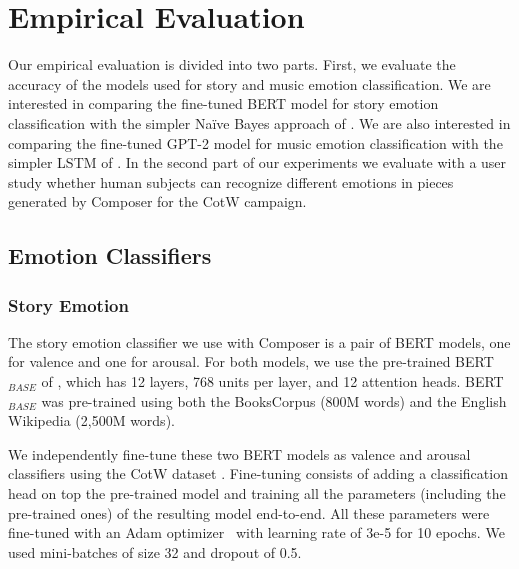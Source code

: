 
\section{Empirical Evaluation}

Our empirical evaluation is divided into two parts. First, we evaluate the accuracy of the models used for story and music emotion classification. We are interested in comparing the fine-tuned BERT model for story emotion classification with the simpler Na\"ive Bayes approach of \cite{padovani2017}. We are also interested in comparing the fine-tuned GPT-2 model for music emotion classification with the simpler LSTM of \cite{ferreira_2019}. In the second part of our experiments we evaluate with a user study whether human subjects can recognize different emotions in pieces generated by Composer for the CotW campaign.


\subsection{Emotion Classifiers}

\subsubsection{Story Emotion}

The story emotion classifier we use with Composer is a pair of BERT models, one for valence and one for arousal. For both models, we use the pre-trained BERT$_{BASE}$ of \cite{devlin2018bert},
which has 12 layers, 768 units per layer, and 12 attention heads. BERT$_{BASE}$ was pre-trained using both the BooksCorpus (800M words) \cite{zhu2015aligning} and
the English Wikipedia (2,500M words).

We independently fine-tune these two BERT models as valence and arousal
classifiers using the CotW dataset \cite{padovani2017}. Fine-tuning consists of adding a
classification head on top the pre-trained model and training all the
parameters (including the pre-trained ones) of the resulting model
end-to-end. All these parameters were fine-tuned with an Adam optimizer~\cite{adam14} with learning rate of 3e-5 for 10 epochs. We used mini-batches of size 32 and dropout of 0.5.

